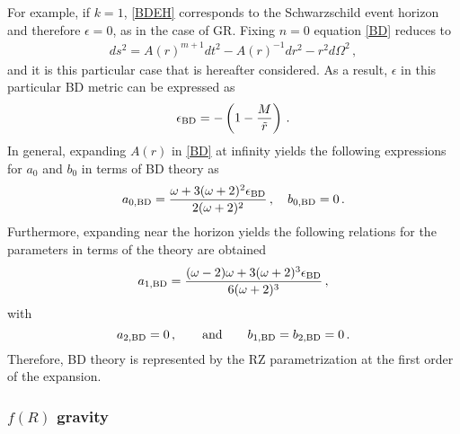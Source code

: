 \documentclass[a4paper,aps,twocolumn,showpacs,showkeys,nofootinbib,preprintnumbers,superscriptaddress,amsmath,amssymb,amsfonts]{revtex4-1}
\begin{document}
For example, if $k=1$, \eqref{BDEH} corresponds to the
Schwarzschild event horizon and therefore $\epsilon=0$, as in the case of GR.
Fixing $n=0$ equation \eqref{BD} reduces to
%
\begin{eqnarray}
ds^2 = A(r)^{m+1} dt^2 - A(r)^{-1} dr^2 - r^2 d\Omega^2 \,,
\label{BDm}
\end{eqnarray}
%
and it is this particular case that is hereafter considered.
As a result, $\epsilon$ in this particular BD metric can be expressed as
%
\begin{equation}
\epsilon_{{\rm BD}} =-\left(1-\frac{M}{\tilde r}\right)\,.
\end{equation}
In general, expanding $A(r)$ in \eqref{BD} at infinity
yields the following expressions for $a_0$ and $b_0$ 
in terms of BD theory as
%
\begin{equation}
\label{a0BD}
a_{0,{\rm BD}} = \frac{\omega +3 (\omega +2)^2
  \epsilon_{{\rm BD}}}{2 (\omega +2)^2} \,, \quad
b_{0,{{\rm BD}}} = 0 \,.
\end{equation}
%
Furthermore, expanding near the horizon yields the following relations for the
parameters in terms of the theory are obtained
%
\begin{equation}
a_{1,{{\rm BD}}} = \frac{(\omega -2) \omega +3 (\omega +2)^3
  \epsilon_{{\rm BD}} }{6 (\omega +2)^3} \,,
\end{equation}
%
with 
%
\begin{equation}
a_{2,{\rm BD}}=0\,,\qquad {\rm and} \qquad 
b_{1,{\rm BD}}=b_{2,{\rm BD}}=0\,.
\end{equation}
%
Therefore, BD theory is represented by the
RZ parametrization at the first order of the expansion. 

\subsubsection{$f(R)$ gravity}
\label{tre.due.tre}
\end{document}
